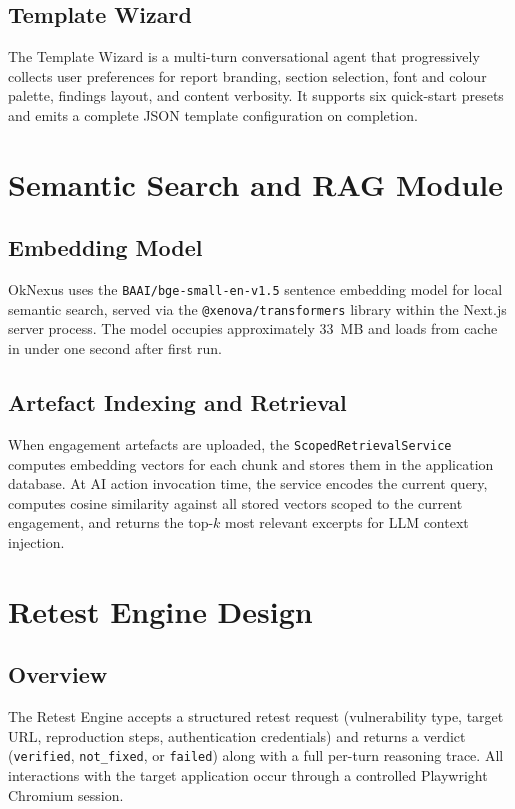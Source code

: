 \subsection{Template Wizard}

The Template Wizard is a multi-turn conversational agent that progressively collects user preferences for report branding, section selection, font and colour palette, findings layout, and content verbosity. It supports six quick-start presets and emits a complete JSON template configuration on completion.

\section{Semantic Search and RAG Module}

\subsection{Embedding Model}

OkNexus uses the \texttt{BAAI/bge-small-en-v1.5} sentence embedding model for local semantic search, served via the \texttt{@xenova/transformers} library within the Next.js server process. The model occupies approximately 33~MB and loads from cache in under one second after first run.

\subsection{Artefact Indexing and Retrieval}

When engagement artefacts are uploaded, the \texttt{ScopedRetrievalService} computes embedding vectors for each chunk and stores them in the application database. At AI action invocation time, the service encodes the current query, computes cosine similarity against all stored vectors scoped to the current engagement, and returns the top-$k$ most relevant excerpts for LLM context injection.

\section{Retest Engine Design}

\subsection{Overview}

The Retest Engine accepts a structured retest request (vulnerability type, target URL, reproduction steps, authentication credentials) and returns a verdict (\texttt{verified}, \texttt{not\_fixed}, or \texttt{failed}) along with a full per-turn reasoning trace. All interactions with the target application occur through a controlled Playwright Chromium session.

